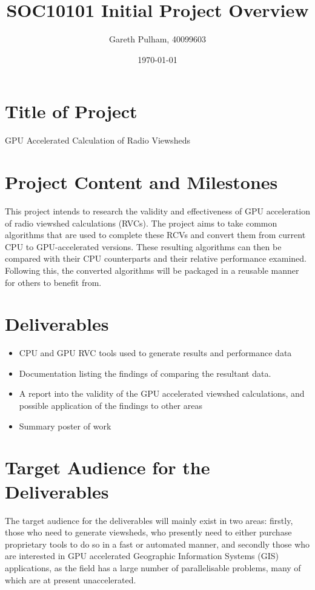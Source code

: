 \documentclass[a4paper]{article}
\begin{document}
    \begin{titlepage}
        \title{SOC10101 Initial Project Overview}
        \author{Gareth Pulham, 40099603}
        \date{\today}
        \maketitle
        \thispagestyle{empty}
    \end{titlepage}

    \section{Title of Project}
        GPU Accelerated Calculation of Radio Viewsheds

    \section{Project Content and Milestones}
        This project intends to research the validity and effectiveness of GPU acceleration of radio viewshed
        calculations (RVCs). The project aims to take common algorithms that are used to complete these RCVs and
        convert them from current CPU to GPU-accelerated versions. These resulting algorithms can then be compared with
        their CPU counterparts and their relative performance examined. Following this, the converted algorithms will
        be packaged in a reusable manner for others to benefit from.

    \section{Deliverables}
        \begin{itemize}
            \item CPU and GPU RVC tools used to generate results and performance data
            \item Documentation listing the findings of comparing the resultant data.
            \item A report into the validity of the GPU accelerated viewshed calculations, and possible application of
                the findings to other areas
            \item Summary poster of work
        \end{itemize}

    \section{Target Audience for the Deliverables}
        The target audience for the deliverables will mainly exist in two areas: firstly, those who need to generate
        viewsheds, who presently need to either purchase proprietary tools to do so in a fast or automated manner, and
        secondly those who are interested in GPU accelerated Geographic Information Systems (GIS) applications, as the
        field has a large number of parallelisable problems, many of which are at present unaccelerated.
\end{document}
